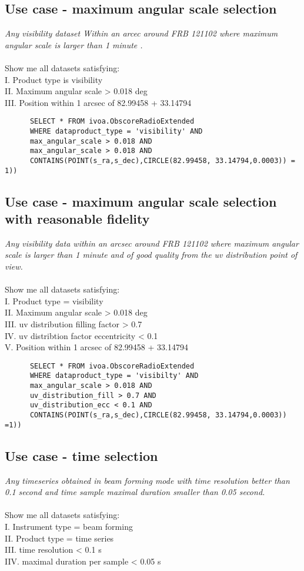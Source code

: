 \subsection{Use case - maximum angular scale selection}
\textit{Any visibility dataset Within an arcec around FRB 121102  where  maximum angular scale is larger than 1 minute .}\\ \\
Show me all datasets satisfying:\\
I. Product type is visibility \\
II. Maximum angular scale  >  0.018 deg \\
III. Position within 1 arcsec of 82.99458 + 33.14794
\begin{verbatim}
      SELECT * FROM ivoa.ObscoreRadioExtended
      WHERE dataproduct_type = 'visibility' AND
      max_angular_scale > 0.018 AND
      max_angular_scale > 0.018 AND
      CONTAINS(POINT(s_ra,s_dec),CIRCLE(82.99458, 33.14794,0.0003)) = 1))
\end{verbatim}

\subsection{Use case - maximum angular scale selection with reasonable fidelity}
\textit{Any visibility data within an arcsec around FRB 121102 where  maximum angular scale is larger than 1 minute  and 
of good quality from the uv distribution point of view.}\\ \\
Show me all datasets satisfying:\\
I. Product type = visibility \\
II. Maximum angular scale  >  0.018 deg \\
III. uv distribution filling factor  > 0.7 \\
IV. uv distribtion factor eccentricity  < 0.1 \\
V. Position within 1 arcsec of 82.99458 + 33.14794
\begin{verbatim}
      SELECT * FROM ivoa.ObscoreRadioExtended
      WHERE dataproduct_type = 'visibilty' AND
      max_angular_scale > 0.018 AND
      uv_distribution_fill > 0.7 AND
      uv_distribution_ecc < 0.1 AND 
      CONTAINS(POINT(s_ra,s_dec),CIRCLE(82.99458, 33.14794,0.0003)) =1))
\end{verbatim}

\subsection{Use case -  time selection }
\textit{Any timeseries obtained in beam forming mode with time resolution better than 0.1 second and time sample maximal duration smaller than 0.05 second. }\\ \\
Show me all datasets satisfying:\\
I. Instrument type = beam forming\\
II. Product type = time series  \\
III. time resolution < 0.1 s\\
IIV. maximal duration per sample  < 0.05 s \\


